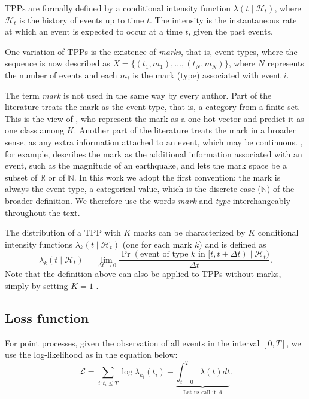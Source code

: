     TPPs are formally defined by a conditional intensity function $\lambda(t \mid \mathcal{H}_t)$, where $\mathcal{H}_t$ is the history of events up to time $t$. The intensity is the instantaneous rate at which an event is expected to occur at a time $t$, given the past events.

    One variation of TPPs is the existence of \textit{marks}, that is, event types, where the sequence is now described as $X = \{(t_1, m_1), \ldots, (t_N, m_N)\}$, where $N$ represents the number of events and each $m_i$ is the mark (type) associated with event $i$.

    The term \textit{mark} is not used in the same way by every author. Part of the literature treats the mark as the event type, that is, a category from a finite set. This is the view of , who represent the mark as a one-hot vector and predict it as one class among $K$. Another part of the literature treats the mark in a broader sense, as any extra information attached to an event, which may be continuous. , for example, describes the mark as the additional information associated with an event, such as the magnitude of an earthquake, and lets the mark space be a subset of $\mathbb{R}$ or of $\mathbb{N}$. In this work we adopt the first convention: the mark is always the event type, a categorical value, which is the discrete case ($\mathbb{N}$) of the broader definition. We therefore use the words \textit{mark} and \textit{type} interchangeably throughout the text.

    The distribution of a TPP with $K$ marks can be characterized by $K$ conditional intensity functions $\lambda_k(t \mid \mathcal{H}_t)$ (one for each mark $k$) and is defined as
    \begin{equation}
        \lambda_k(t \mid \mathcal{H}_t)
        = \lim_{\Delta t \to 0}
        \frac{
        \Pr(\text{event of type } k \text{ in } [t, t + \Delta t) \mid \mathcal{H}_t)
        }{
        \Delta t
        }.
    \end{equation}
    Note that the definition above can also be applied to TPPs without marks, simply by setting $K = 1$ \cite{shchur_neural_2021}.

    \subsection{Loss function}\label{sec:funcao-custo}

    For point processes, given the observation of all events in the interval $[0,T]$, we use the log-likelihood as in the equation below:
    \begin{equation}
        \mathcal{L} = \sum_{i:t_i \leq T} \log \lambda_{k_i}(t_i) - \underbrace{\int_{t=0}^{T} \lambda(t)dt}_{\text{Let us call it $\Lambda$}}. \label{eq:log_likelihood_final}
    \end{equation}

